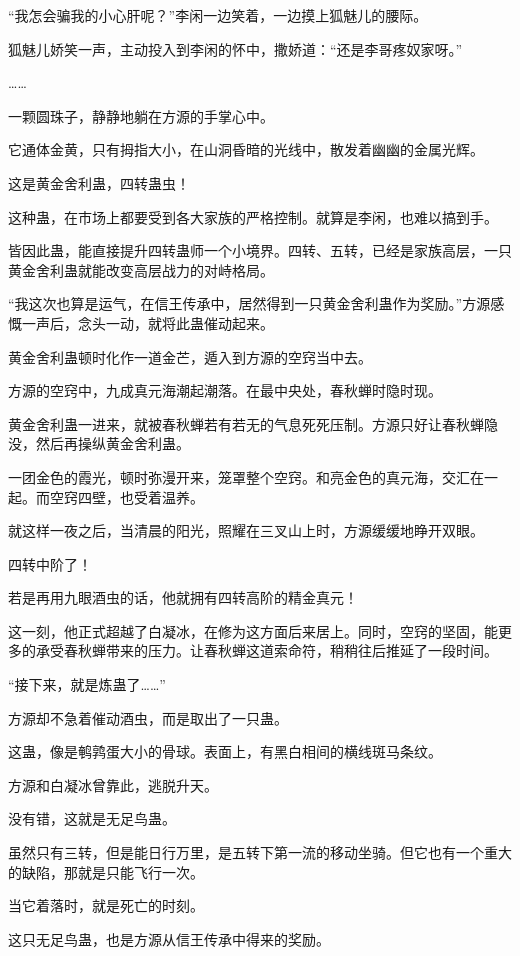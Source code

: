 \begin{this_body}
“我怎会骗我的小心肝呢？”李闲一边笑着，一边摸上狐魅儿的腰际。

狐魅儿娇笑一声，主动投入到李闲的怀中，撒娇道：“还是李哥疼奴家呀。”

……

一颗圆珠子，静静地躺在方源的手掌心中。

它通体金黄，只有拇指大小，在山洞昏暗的光线中，散发着幽幽的金属光辉。

这是黄金舍利蛊，四转蛊虫！

这种蛊，在市场上都要受到各大家族的严格控制。就算是李闲，也难以搞到手。

皆因此蛊，能直接提升四转蛊师一个小境界。四转、五转，已经是家族高层，一只黄金舍利蛊就能改变高层战力的对峙格局。

“我这次也算是运气，在信王传承中，居然得到一只黄金舍利蛊作为奖励。”方源感慨一声后，念头一动，就将此蛊催动起来。

黄金舍利蛊顿时化作一道金芒，遁入到方源的空窍当中去。

方源的空窍中，九成真元海潮起潮落。在最中央处，春秋蝉时隐时现。

黄金舍利蛊一进来，就被春秋蝉若有若无的气息死死压制。方源只好让春秋蝉隐没，然后再操纵黄金舍利蛊。

一团金色的霞光，顿时弥漫开来，笼罩整个空窍。和亮金色的真元海，交汇在一起。而空窍四壁，也受着温养。

就这样一夜之后，当清晨的阳光，照耀在三叉山上时，方源缓缓地睁开双眼。

四转中阶了！

若是再用九眼酒虫的话，他就拥有四转高阶的精金真元！

这一刻，他正式超越了白凝冰，在修为这方面后来居上。同时，空窍的坚固，能更多的承受春秋蝉带来的压力。让春秋蝉这道索命符，稍稍往后推延了一段时间。

“接下来，就是炼蛊了……”

方源却不急着催动酒虫，而是取出了一只蛊。

这蛊，像是鹌鹑蛋大小的骨球。表面上，有黑白相间的横线斑马条纹。

方源和白凝冰曾靠此，逃脱升天。

没有错，这就是无足鸟蛊。

虽然只有三转，但是能日行万里，是五转下第一流的移动坐骑。但它也有一个重大的缺陷，那就是只能飞行一次。

当它着落时，就是死亡的时刻。

这只无足鸟蛊，也是方源从信王传承中得来的奖励。


\end{this_body}
